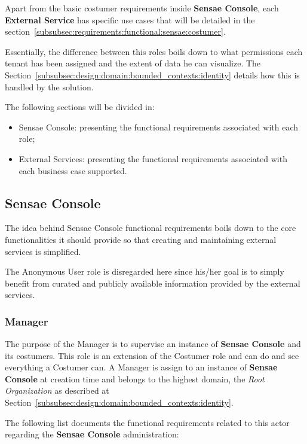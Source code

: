 Apart from the basic costumer requirements inside \textbf{Sensae Console}, each \textbf{External Service} has specific use cases that will be detailed in the section~\ref{subsubsec:requirements:functional:sensae:costumer}.

Essentially, the difference between this roles boils down to what permissions each tenant has been assigned and the extent of data he can visualize. The Section~\ref{subsubsec:design:domain:bounded_contexts:identity} details how this is handled by the solution.

The following sections will be divided in:

\begin{itemize}
    \item Sensae Console: presenting the functional requirements associated with each role;
    \item External Services: presenting the functional requirements associated with each business case supported.
\end{itemize}

\subsection{Sensae Console}
\label{subsec:requirements:functional:sensae}

The idea behind Sensae Console functional requirements boils down to the core functionalities it should provide so that creating and maintaining external services is simplified.

The Anonymous User role is disregarded here since his/her goal is to simply benefit from curated and publicly available information provided by the external services. 

\subsubsection{Manager}
\label{subsubsec:requirements:functional:sensae:manager}

The purpose of the Manager is to supervise an instance of \textbf{Sensae Console} and its costumers. This role is an extension of the Costumer role and can do and see everything a Costumer can. A Manager is assign to an instance of \textbf{Sensae Console} at creation time and belongs to the highest domain, the \textit{Root Organization} as described at Section~\ref{subsubsec:design:domain:bounded_contexts:identity}.

The following list documents the functional requirements related to this actor regarding the \textbf{Sensae Console} administration:

